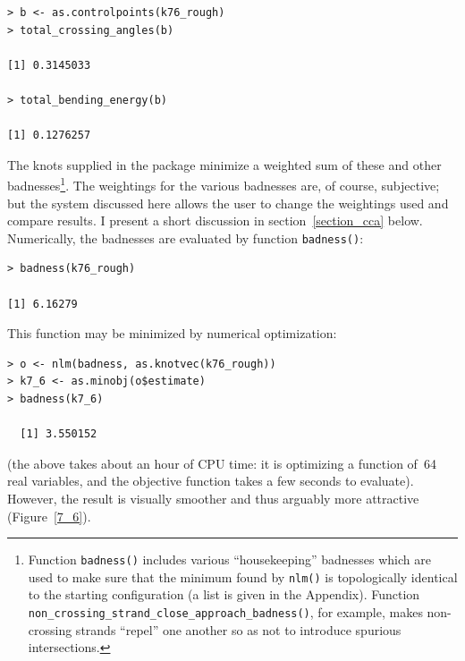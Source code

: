 \documentclass{birkjour}
\theoremstyle{definition}
\theoremstyle{remark}
\numberwithin{equation}{section}
\begin{document}
\begin{verbatim}
> b <- as.controlpoints(k76_rough)
> total_crossing_angles(b)

[1] 0.3145033

> total_bending_energy(b)

[1] 0.1276257
\end{verbatim}

The knots supplied in the package minimize a weighted sum of these and
other badnesses\footnote{Function {\tt badness()} includes various
``housekeeping'' badnesses which are used to make sure that the
minimum found by {\tt nlm()} is topologically identical to the
starting configuration (a list is given in the Appendix).  Function
{\tt non\_crossing\_strand\_close\_approach\_badness()}, for example,
makes non-crossing strands ``repel'' one another so as not to
introduce spurious intersections.}.  The weightings for the various
badnesses are, of course, subjective; but the system discussed here
allows the user to change the weightings used and compare results.  I
present a short discussion in section~\ref{section_cca} below.
Numerically, the badnesses are evaluated by function {\tt badness()}:

\begin{verbatim}
> badness(k76_rough)

[1] 6.16279
\end{verbatim}

This function may be minimized by numerical optimization:

\begin{verbatim}
> o <- nlm(badness, as.knotvec(k76_rough))
> k7_6 <- as.minobj(o$estimate)
> badness(k7_6)

  [1] 3.550152
\end{verbatim}

(the above takes about an hour of CPU time: it is optimizing a
function of~64 real variables, and the objective function takes a few
seconds to evaluate).  However, the result is visually smoother and
thus arguably more attractive (Figure~\ref{7_6}).
\end{document}

